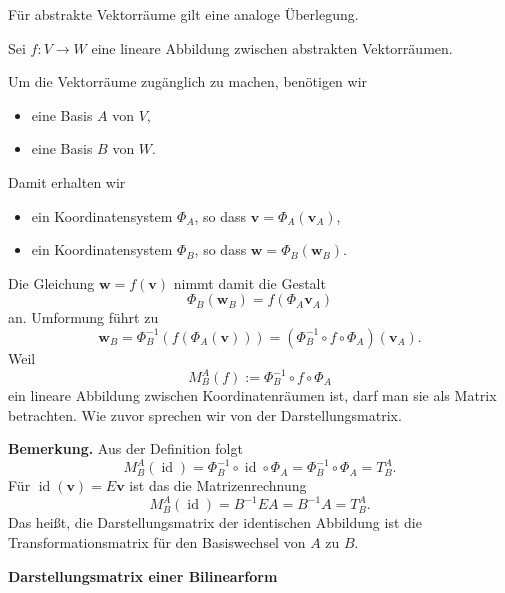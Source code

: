 \documentclass[9pt]{beamer}
\newcommand{\bv}[1]{\mathbf{#1}}
\newcommand{\id}{\operatorname{id}}
\newcommand{\strong}[1]{\textsf{\textbf{#1}}}
\newcommand{\parspace}{\vspace{0.8em}}
\begin{document}
\begin{frame}
Für abstrakte Vektorräume gilt eine analoge Überlegung.

\parspace
Sei $f\colon V\to W$ eine lineare Abbildung zwischen abstrakten
Vektorräumen.\pause

\parspace
Um die Vektorräume zugänglich zu machen, benötigen wir
\begin{itemize}
\item eine Basis $A$ von $V$,
\item eine Basis $B$ von $W$.
\end{itemize}

\parspace
Damit erhalten wir
\begin{itemize}
\item ein Koordinatensystem $\Phi_A$, so dass $\bv v = \Phi_A(\bv v_A)$,
\item ein Koordinatensystem $\Phi_B$, so dass $\bv w = \Phi_B(\bv w_B)$.
\end{itemize}
\end{frame}

\begin{frame}
Die Gleichung $\bv w = f(\bv v)$ nimmt damit die Gestalt
\[\Phi_B(\bv w_B) = f(\Phi_A\bv v_A)\]
an. Umformung führt zu
\[\bv w_B = \Phi_B^{-1}(f(\Phi_A(\bv v))) = (\Phi_B^{-1}\circ f\circ\Phi_A)(\bv v_A).\]\pause
Weil
\[M_B^A(f) := \Phi_B^{-1}\circ f\circ\Phi_A\]
ein lineare Abbildung zwischen Koordinatenräumen ist, darf man sie
als Matrix betrachten. Wie zuvor sprechen wir von der Darstellungsmatrix.
\end{frame}

\begin{frame}
\strong{Bemerkung.} Aus der Definition folgt
\[M_B^A(\id) = \Phi_B^{-1}\circ\id\circ\Phi_A = \Phi_B^{-1}\circ\Phi_A = T_B^A.\]
Für $\id(\bv v)=E\bv v$ ist das die Matrizenrechnung
\[M_B^A(\id) = B^{-1}EA = B^{-1}A = T_B^A.\]
Das heißt, die Darstellungsmatrix der identischen Abbildung ist die
Transformationsmatrix für den Basiswechsel von $A$ zu $B$.
\end{frame}

\begin{frame}
\begin{center}
\strong{Darstellungsmatrix einer Bilinearform}
\end{center}
\end{frame}
\end{document}
